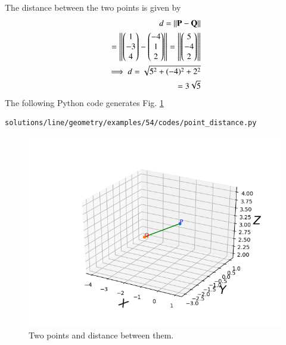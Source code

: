 The distance between the two points is given by
\begin{equation}
\begin{aligned}
d = \left\lVert\mathbf{P} - \mathbf{Q}\right\rVert\\
       = \left\lVert\begin{pmatrix}
      1\\ 
      -3\\
      4\\
  
    \end{pmatrix} - \begin{pmatrix}
      -4\\ 
      1\\
      2\\
  
    \end{pmatrix}\right\rVert = \left\lVert\begin{pmatrix}
      5\\ 
      -4\\
      2\\
  
    \end{pmatrix}\right\rVert
\\
\implies d = \sqrt{5^2 + (-4)^2 + 2^2}\\
 = 3\sqrt{5}
\end{aligned}
\end{equation}
The  following Python code generates Fig. \ref{fig:line_geo_54_point_distance}
\begin{lstlisting}
solutions/line/geometry/examples/54/codes/point_distance.py
\end{lstlisting}

\begin{figure}[!ht]
\centering
\includegraphics[width=\columnwidth]{./solutions/point_vector/54/figs/point_distance.png}
\caption{Two points and distance between them.}
\label{fig:line_geo_54_point_distance}
\end{figure}
